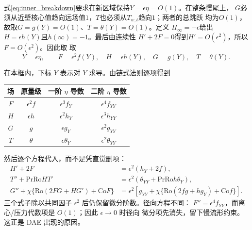 \documentclass[UTF8,zihao=-4,openany]{ctexbook}
\newcommand{\eps}{\epsilon}
\newcommand{\Ro}{\mathrm{Ro}}
\newcommand{\Pran}{\mathrm{Pr}}
\newcommand{\Co}{\mathrm{Co}}
\begin{document}
式\eqref{eq:inner_breakdown}要求在新区域保持$Y=\eps\eta=O(1)$。在整条慢尾上，
$G$必须从近壁核心值趋向远场值$1$，$T$也必须从$T_{w,t}$趋向$1$；两者的总跳跃
均为$O(1)$，故取$G=g(Y)=O(1)$、$T=\theta(Y)=O(1)$。定义
$H_\infty=-\eps$给出$H=\eps h(Y)$且$h(\infty)=-1$。最后由连续性
$H'+2F=0$得到$H'=O(\eps^2)$，所以$F=O(\eps^2)$。因此取
取
\begin{equation}\label{eq:outerscaling}
 Y=\eps\eta,\qquad
 F=\eps^2 f(Y),\quad H=\eps h(Y),\quad G=g(Y),\quad T=\theta(Y).
\end{equation}

\begin{derivationbox}
在本框内，下标 $Y$ 表示对 $Y$ 求导。由链式法则逐项得到
\begin{center}
\begin{tabular}{cccc}
\toprule
场 & 原量级 & 一阶 $\eta$ 导数 & 二阶 $\eta$ 导数\\
\midrule
$F$ & $\eps^2f$ & $\eps^3f_Y$ & $\eps^4f_{YY}$\\
$H$ & $\eps h$ & $\eps^2h_Y$ & $\eps^3h_{YY}$\\
$G$ & $g$ & $\eps g_Y$ & $\eps^2g_{YY}$\\
$T$ & $\theta$ & $\eps\theta_Y$ & $\eps^2\theta_{YY}$\\
\bottomrule
\end{tabular}
\end{center}
然后逐个方程代入，而不是凭直觉删项：
\begin{align*}
 H'+2F&=\eps^2(h_Y+2f),\\
 T''+\Pran\Ro H T'&=\eps^2(\theta_{YY}+\Pran\Ro h\theta_Y),\\
 G''+\chi\{\Ro(2FG+HG')+\Co F\}
 &=\eps^2\!\left[g_{YY}+\chi\{\Ro(2fg+hg_Y)+\Co f\}\right].
\end{align*}
三个式子除以共同因子 $\eps^2$ 后仍保留微分阶数。径向方程不同：
$F''=\eps^4f_{YY}$，而离心/压力代数项是 $O(1)$；因此 $\eps\to0$ 时径向
微分项先消失，留下慢流形约束。这正是 DAE 出现的原因。
\end{derivationbox}
\end{document}

